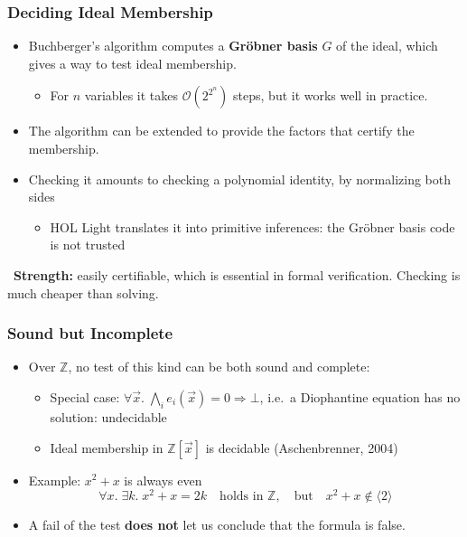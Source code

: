 \documentclass[usepdftitle=false,aspectratio=169,usenames,dvipsnames]{beamer}
\newcommand{\bluecheck}{{\color{blue}\checkmark}}
\newcommand\vitem{\vfill\item}
\newcommand\pvitem{\pause\vfill\item}
\newcommand{\strength}[1]{\begin{strengthbox}\small\bluecheck\ \textbf{Strength:} #1\end{strengthbox}}
\begin{document}
\begin{frame}
  \frametitle{Deciding Ideal Membership}
  \begin{itemize}
    \item Buchberger's algorithm computes a \textbf{Gr\"obner basis} $G$ of the ideal, which gives a way to test ideal membership.
      \begin{itemize}
        \item For $n$ variables it takes $\mathcal{O}(2^{2^n})$ steps, but it works well in practice.
      \end{itemize}
    \vitem The algorithm can be extended to provide the factors that certify the membership.
    \vitem Checking it amounts to checking a polynomial identity, by normalizing both sides
      \begin{itemize}
        \item HOL Light translates it into primitive inferences: the Gr\"obner basis code is not trusted
      \end{itemize}
  \end{itemize}
  \pause
  \vfill
  \strength{easily certifiable, which is essential in formal verification. Checking is much cheaper than solving.}
\end{frame}

\begin{frame}
  \frametitle{Sound but Incomplete}
  \begin{itemize}
    \item Over $\mathbb{Z}$, no test of this kind can be both sound and complete:
      \begin{itemize}
        \item Special case: $\forall \vec{x}.\; \bigwedge_i e_i(\vec{x}) = 0 \Rightarrow \bot$, i.e.\ a Diophantine equation has no solution: undecidable
        \item Ideal membership in $\mathbb{Z}[\vec{x}]$ is decidable (Aschenbrenner, 2004)
      \end{itemize}
    \pvitem Example: $x^2 + x$ is always even
      \[ \forall x.\; \exists k.\; x^2 + x = 2k \quad \text{holds in } \mathbb{Z}, \quad \text{but} \quad x^2 + x \notin \langle 2 \rangle \]
    \pvitem A fail of the test \textbf{does not} let us conclude that the formula is false.
  \end{itemize}
\end{frame}
\end{document}

